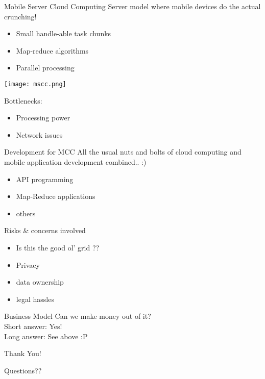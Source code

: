 \documentclass{beamer}
\begin{document}
\begin{frame}{Mobile Server Cloud Computing}
Server model where mobile devices do the actual crunching!
\begin{itemize}
 \item Small handle-able task chunks
 \pause
 \item Map-reduce algorithms
 \pause
 \item Parallel processing
 \pause
\end{itemize}

\begin{center} 
 \texttt{[image: mscc.png]} 
\end{center}
Bottlenecks:
\begin{itemize}
 \item Processing power
 \item Network issues
\end{itemize}
\end{frame}

\begin{frame}{Development for MCC}
All the usual nuts and bolts of cloud computing and mobile application development combined.. :)

\begin{itemize}
 \item API programming
 \item Map-Reduce applications
 \item others
\end{itemize}
\end{frame}

\begin{frame}{Risks \& concerns involved}
\begin{itemize}
 \item Is this the good ol' grid ??
 \pause
 \item Privacy 
 \pause
 \item data ownership
 \pause
 \item legal hassles
\end{itemize}
\end{frame}


\begin{frame}{Business Model}
Can we make money out of it? \\
\pause
Short answer:
\pause
Yes! \\
\pause
Long answer:
\pause
See above :P
\end{frame}


\begin{frame}{Thank You!}
\begin{center}
Questions??
\end{center}
\end{frame}
\end{document}
